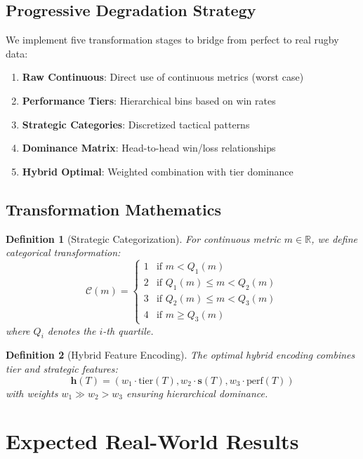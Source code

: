 \documentclass[11pt,a4paper]{article}
\newtheorem{definition}{Definition}
\newcommand{\R}{\mathbb{R}}
\begin{document}
\subsection{Progressive Degradation Strategy}

We implement five transformation stages to bridge from perfect to real rugby data:

\begin{enumerate}
    \item \textbf{Raw Continuous}: Direct use of continuous metrics (worst case)
    \item \textbf{Performance Tiers}: Hierarchical bins based on win rates
    \item \textbf{Strategic Categories}: Discretized tactical patterns
    \item \textbf{Dominance Matrix}: Head-to-head win/loss relationships
    \item \textbf{Hybrid Optimal}: Weighted combination with tier dominance
\end{enumerate}

\subsection{Transformation Mathematics}

\begin{definition}[Strategic Categorization]
For continuous metric $m \in \R$, we define categorical transformation:
\[
\mathcal{C}(m) = \begin{cases}
    1 & \text{if } m < Q_1(m) \\
    2 & \text{if } Q_1(m) \leq m < Q_2(m) \\
    3 & \text{if } Q_2(m) \leq m < Q_3(m) \\
    4 & \text{if } m \geq Q_3(m)
\end{cases}
\]
where $Q_i$ denotes the $i$-th quartile.
\end{definition}

\begin{definition}[Hybrid Feature Encoding]
The optimal hybrid encoding combines tier and strategic features:
\[
\mathbf{h}(T) = (w_1 \cdot \text{tier}(T), w_2 \cdot \mathbf{s}(T), w_3 \cdot \text{perf}(T))
\]
with weights $w_1 \gg w_2 > w_3$ ensuring hierarchical dominance.
\end{definition}

\section{Expected Real-World Results}
\end{document}
